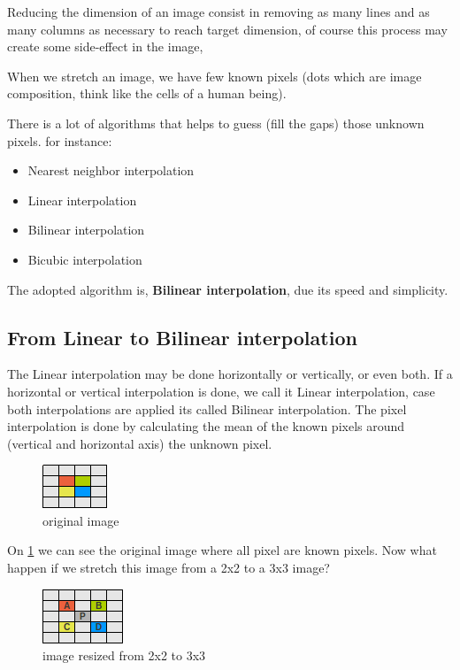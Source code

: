\documentclass{article}
\begin{document}
	Reducing the dimension of an image consist in removing as many lines and as many columns as necessary to reach target dimension, of course this
	process may create some side-effect in the image, 

	When we stretch an image, we have few known pixels (dots which are image composition, think like the cells of a human being).

	There is a lot of algorithms that helps to guess (fill the gaps) those unknown pixels. for instance:

	\begin{itemize}
	  \item Nearest neighbor interpolation
	  \item Linear interpolation
	  \item Bilinear interpolation
	  \item Bicubic interpolation
	\end{itemize}

	The adopted algorithm is, \textbf{Bilinear interpolation},  due its speed and simplicity.
	
\subsection{From Linear to Bilinear interpolation}

	The Linear interpolation may be done horizontally or vertically, or even both. If a horizontal or vertical interpolation is done, we call it
	Linear interpolation, case both interpolations are applied its called Bilinear interpolation.	
	The pixel interpolation is done by calculating the mean of the known pixels around (vertical and horizontal axis) the unknown pixel. 

	\begin{figure} [H]
		\centering
		\includegraphics[scale=1]{images/bilinear_interpolation_1}
		\caption{original image \label{bilinear1}}
	\end{figure}

	On \ref{bilinear1} we can see the original image where all pixel are known pixels. Now what happen if we stretch this image 
	from a 2x2 to a 3x3 image?
	
	\begin{figure} [H]
		\centering
		\includegraphics[scale=1]{images/bilinear_interpolation_2}
		\caption{image resized from 2x2 to 3x3 \label{bilinear2}}
	\end{figure}
\end{document}
